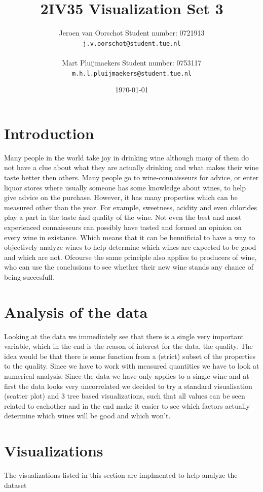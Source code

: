 \documentclass[a4paper,twoside,11pt]{article}
\title{\vspace{-\baselineskip}\sffamily\bfseries 2IV35 Visualization Set 3}
\author{Jeroen van Oorschot \qquad Student number: 0721913 \\{\tt j.v.oorschot@student.tue.nl}\\ \\Mart Pluijmaekers \qquad Student number: 0753117 \\{\tt m.h.l.pluijmaekers@student.tue.nl}}
\date{\today}
\begin{document}
\maketitle

\pagebreak
\tableofcontents
\newpage
\section{Introduction}
Many people in the world take joy in drinking wine although many of them do not have a clue about what they are actually drinking and what makes their wine taste better then others. Many people go to wine-connaisseurs for advice, or enter liquor stores where usually someone has some knowledge about wines, to help give advice on the purchase. However, it has many properties which can be measured other than the year. For example, sweetness, acidity and even chlorides play a part in the taste \'and quality of the wine. Not even the best and most experienced connaisseurs can possibly have tasted and formed an opinion on every wine in existance. Which means that it can be bennificial to have a way to objectively analyze wines to help determine which wines are expected to be good and which are not. Ofcourse the same principle also applies to producers of wine, who can use the conclusions to see whether their new wine stands any chance of being succesfull.

\section{Analysis of the data}
Looking at the data we immediately see that there is a single very important variable, which in the end is the reason of interest for the data, the quality. The idea would be that there is some function from a (strict) subset of the properties to the quality. Since we have to work with measured quantities we have to look at numerical analysis. Since the data we have only applies to a single wine and at first the data looks very uncorrelated we decided to try a standard visualisation (scatter plot) and 3 tree based visualizations, such that all values can be seen related to eachother and in the end make it easier to see which factors actually determine which wines will be good and which won't.


\section{Visualizations}
The visualizations listed in this section are implmented to help analyze the dataset
\end{document}
